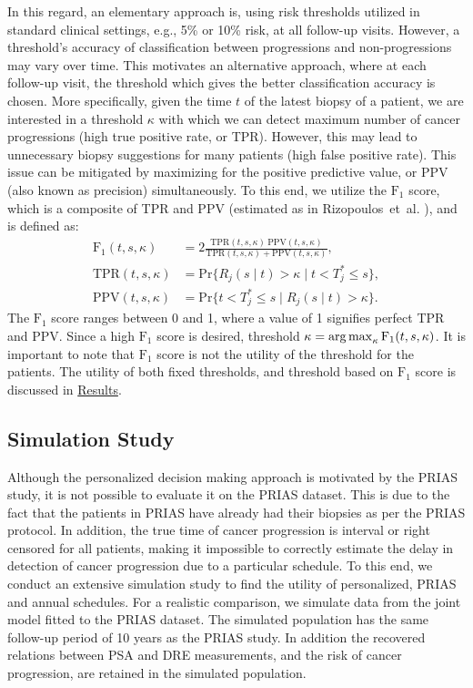 In this regard, an elementary approach is, using risk thresholds utilized in standard clinical settings, e.g., 5\% or 10\% risk, at all follow-up visits. However, a threshold's accuracy of classification between progressions and non-progressions may vary over time. This motivates an  alternative approach, where at each follow-up visit, the threshold which gives the better classification accuracy is chosen. More specifically, given the time $t$ of the latest biopsy of a patient, we are interested in a threshold $\kappa$ with which we can detect maximum number of cancer progressions (high true positive rate, or TPR). However, this may lead to unnecessary biopsy suggestions for many patients (high false positive rate). This issue can be mitigated by maximizing for the positive predictive value, or PPV (also known as precision) simultaneously. To this end, we utilize the $\mbox{F}_1$ score, which is a composite of TPR and PPV (estimated as in Rizopoulos~et~al. \cite{landmarking2017}), and is defined as:
\begin{equation}
\label{eq:F1_TPR_PPV}
\begin{split}
\mbox{F}_1(t,  s, \kappa) &= 2\frac{\mbox{TPR}(t,  s, \kappa)\ \mbox{PPV}(t,  s, \kappa)}{\mbox{TPR}(t,  s, \kappa) + \mbox{PPV}(t,  s, \kappa)},\\
\mbox{TPR}(t,  s, \kappa) &= \mbox{Pr}\big\{R_j(s \mid t) > \kappa \mid t < T^*_j \leq s\big\},\\
\mbox{PPV}(t,  s, \kappa) &= \mbox{Pr}\big\{t < T^*_j \leq s \mid R_j(s \mid t) > \kappa \big\}.
\end{split}
\end{equation}
The $\mbox{F}_1$ score ranges between 0 and 1, where a value of 1 signifies perfect TPR and PPV. Since a high $\mbox{F}_1$ score is desired, threshold ${\kappa=\operatorname{arg\,max}_{\kappa} \mbox{F}_1(t, s, \kappa)}$. It is important to note that $\mbox{F}_1$ score is not the utility of the threshold for the patients. The utility of both fixed thresholds, and threshold based on $\mbox{F}_1$ score is discussed in \hyperref[sec:results]{Results}. 

\subsection{Simulation Study}
Although the personalized decision making approach is motivated by the PRIAS study, it is not possible to evaluate it on the PRIAS dataset. This is due to the fact that the patients in PRIAS have already had their biopsies as per the PRIAS protocol. In addition, the true time of cancer progression is interval or right censored for all patients, making it impossible to correctly estimate the delay in detection of cancer progression due to a particular schedule. To this end, we conduct an extensive simulation study to find the utility of personalized, PRIAS and annual schedules. For a realistic comparison, we simulate data from the joint model fitted to the PRIAS dataset. The simulated population has the same follow-up period of 10 years as the PRIAS study. In addition the recovered relations between PSA and DRE measurements, and the risk of cancer progression, are retained in the simulated population.

